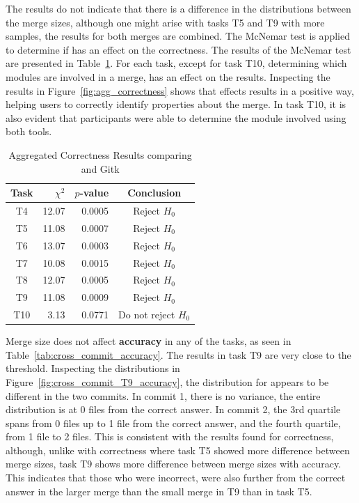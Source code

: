 The results do not indicate that there is a difference in the
distributions between the merge sizes, although one might arise with
tasks T5 and T9 with more samples, the results for both merges are
combined. The McNemar test is applied to determine if \tool{} has an
effect on the correctness. The results of the McNemar test are presented
in Table~\ref{tab:mcnemar_test_results}. For each task, except for task
T10, determining which modules are involved in a merge, \tool{} has an
effect on the results. Inspecting the results in
Figure~\ref{fig:agg_correctness} shows that \tool{} effects results in a
positive way, helping users to correctly identify properties about the
merge. In task T10, it is also evident that participants were able to
determine the module involved using both tools.

\begin{table}[htpb]
  \centering
  \caption{Aggregated Correctness Results comparing \tool{} and Gitk}
  \label{tab:mcnemar_test_results}
  \begin{tabular}{crrc}
    \toprule
    Task & $\chi^2$ & $p$-value & Conclusion\\\midrule
    T4   & 12.07    & 0.0005    & Reject $H_0$\\
    T5   & 11.08    & 0.0007    & Reject $H_0$\\
    T6   & 13.07    & 0.0003    & Reject $H_0$\\
    T7   & 10.08    & 0.0015    & Reject $H_0$\\
    T8   & 12.07    & 0.0005    & Reject $H_0$\\
    T9   & 11.08    & 0.0009    & Reject $H_0$\\
    T10  & 3.13     & 0.0771    & Do not reject $H_0$\\
    \bottomrule
  \end{tabular}
\end{table}

Merge size does not affect \textbf{accuracy} in any of the tasks, as
seen in Table~\ref{tab:cross_commit_accuracy}. The results in task T9
are very close to the threshold. Inspecting the distributions in
Figure~\ref{fig:cross_commit_T9_accuracy}, the distribution for \tool{}
appears to be different in the two commits. In commit 1, there is no
variance, the entire distribution is at 0 files from the correct answer.
In commit 2, the 3rd quartile spans from 0 files up to 1 file from the
correct answer, and the fourth quartile, from 1 file to 2 files. This is
consistent with the results found for correctness, although, unlike with
correctness where task T5 showed more difference between merge sizes,
task T9 shows more difference between merge sizes with accuracy. This
indicates that those who were incorrect, were also further from the
correct answer in the larger merge than the small merge in T9 than in
task T5.

